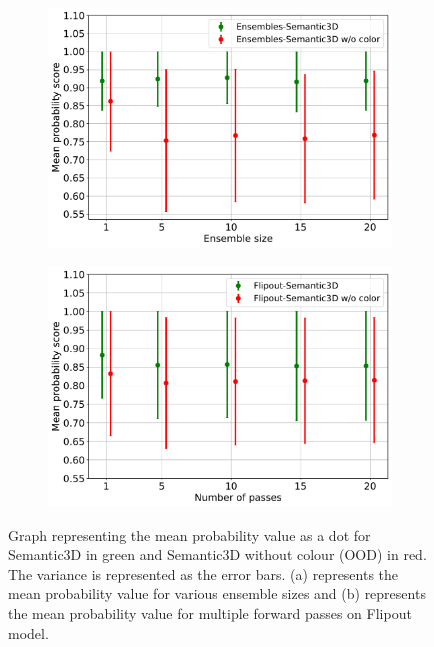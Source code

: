     \begin{figure}[!ht]
        \centering
        \begin{subfigure}{0.98\textwidth}
            \centering
        \includegraphics[scale=0.5]{images/MSP/Ensembles_MSP_semvsemwoc.pdf}
        \caption{}
        \label{fig:msp_ensembles_ood_2}
        \end{subfigure}
        \begin{subfigure}{0.98\textwidth}
            \centering
        \includegraphics[scale=0.5]{images/MSP/Flipout_MSP_semvsemwoc.pdf}
        \caption{}
        \label{fig:msp_flipout_ood_2}
        \end{subfigure}
        \caption{Graph representing the mean probability value as a dot for Semantic3D in green and Semantic3D without colour (OOD) in red. The variance is represented as the error bars.  (a) represents the mean probability value for various ensemble sizes and (b) represents the mean probability value for multiple forward passes on Flipout model.}
    \end{figure}
